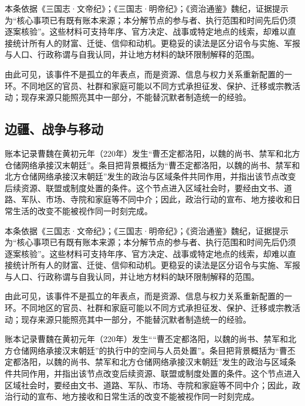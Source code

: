 本条依据《三国志·文帝纪》；《三国志·明帝纪》；《资治通鉴》魏纪，证据提示为“核心事项已有既有账本来源；本分解节点的参与者、执行范围和时间先后仍须逐案核验”。这些材料可支持年序、官方决定、战事或特定地点的线索，却难以直接统计所有人的财富、迁徙、信仰和动机。更稳妥的读法是区分诏令与实施、军报与人口、行政称谓与自我认同，并让地方材料的缺环限制解释的范围。

由此可见，该事件不是孤立的年表点，而是资源、信息与权力关系重新配置的一环。不同地区的官员、社群和家庭可能以不同方式承担征发、保护、迁移或宗教活动；现存来源只能照亮其中一部分，不能替沉默者制造统一的经验。

\subsection{边疆、战争与移动}

账本记录曹魏在黄初元年（220年）发生“曹丕定都洛阳，以魏的尚书、禁军和北方仓储网络承接汉末朝廷”。条目把背景概括为“曹丕定都洛阳，以魏的尚书、禁军和北方仓储网络承接汉末朝廷”发生的政治与区域条件共同作用，并指出该节点改变后续资源、联盟或制度处置的条件。这个节点进入区域社会时，要经由文书、道路、军队、市场、寺院和家庭等不同中介；因此，政治行动的宣布、地方接收和日常生活的改变不能被视作同一时刻完成。

本条依据《三国志·文帝纪》；《三国志·明帝纪》；《资治通鉴》魏纪，证据提示为“核心事项已有既有账本来源；本分解节点的参与者、执行范围和时间先后仍须逐案核验”。这些材料可支持年序、官方决定、战事或特定地点的线索，却难以直接统计所有人的财富、迁徙、信仰和动机。更稳妥的读法是区分诏令与实施、军报与人口、行政称谓与自我认同，并让地方材料的缺环限制解释的范围。

由此可见，该事件不是孤立的年表点，而是资源、信息与权力关系重新配置的一环。不同地区的官员、社群和家庭可能以不同方式承担征发、保护、迁移或宗教活动；现存来源只能照亮其中一部分，不能替沉默者制造统一的经验。

账本记录曹魏在黄初元年（220年）发生““曹丕定都洛阳，以魏的尚书、禁军和北方仓储网络承接汉末朝廷”的执行中的空间与人员处置”。条目把背景概括为“曹丕定都洛阳，以魏的尚书、禁军和北方仓储网络承接汉末朝廷”发生的政治与区域条件共同作用，并指出该节点改变后续资源、联盟或制度处置的条件。这个节点进入区域社会时，要经由文书、道路、军队、市场、寺院和家庭等不同中介；因此，政治行动的宣布、地方接收和日常生活的改变不能被视作同一时刻完成。

